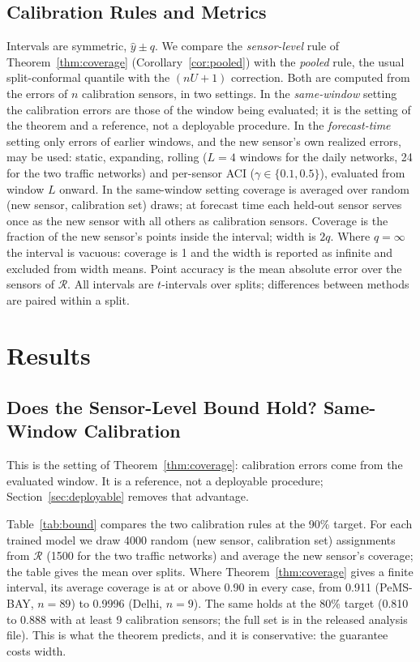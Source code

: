 \documentclass[journal,twoside,web]{ieeecolor}
\begin{document}
\subsection{Calibration Rules and Metrics}
Intervals are symmetric, $\hat y\pm q$. We compare the \emph{sensor-level} rule of
Theorem~\ref{thm:coverage} (Corollary~\ref{cor:pooled}) with the \emph{pooled} rule, the usual
split-conformal quantile with the $(nU+1)$ correction. Both are computed from the errors of $n$
calibration sensors, in two settings. In the \emph{same-window} setting the calibration errors are those
of the window being evaluated; it is the setting of the theorem and a reference, not a deployable
procedure. In the \emph{forecast-time} setting only errors of earlier windows, and the new sensor's own
realized errors, may be used: static, expanding, rolling ($L=4$ windows for the daily networks, 24 for
the two traffic networks) and per-sensor ACI ($\gamma\in\{0.1,0.5\}$), evaluated from window $L$ onward. In the
same-window setting coverage is averaged over random (new sensor, calibration set) draws; at forecast time each
held-out sensor serves once as the new sensor with all others as calibration sensors. Coverage is the fraction of
the new sensor's points inside the interval; width is $2q$. Where $q=\infty$ the
interval is vacuous: coverage is 1 and the width is reported as infinite and excluded from width means.
Point accuracy is the mean absolute error over the sensors of $\mathcal{R}$. All intervals are
$t$-intervals over splits; differences between methods are paired within a split.

\section{Results}
\label{sec:results}

\subsection{Does the Sensor-Level Bound Hold? Same-Window Calibration}
\label{sec:bound}

This is the setting of Theorem~\ref{thm:coverage}: calibration errors come from the evaluated window. It is a reference, not a deployable procedure; Section~\ref{sec:deployable} removes that advantage.

Table~\ref{tab:bound} compares the two calibration rules at the 90\% target. For each trained model
we draw 4000 random (new sensor, calibration set) assignments from $\mathcal{R}$ (1500 for the two
traffic networks) and average the new sensor's coverage; the table gives the mean over splits.
Where Theorem~\ref{thm:coverage} gives a finite interval, its average coverage is at or above 0.90 in
every case, from 0.911 (PeMS-BAY, $n{=}89$) to 0.9996 (Delhi, $n{=}9$). The same holds at the 80\%
target (0.810 to 0.888 with at least 9 calibration sensors; the full set is in the released analysis
file). This is what the theorem predicts, and it is conservative: the guarantee costs width.
\end{document}
